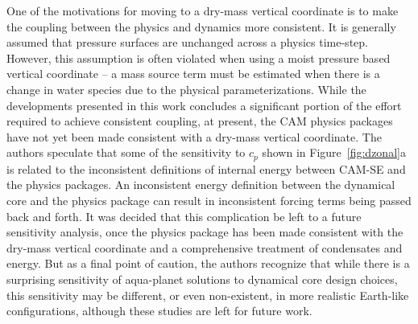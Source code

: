 \documentclass{agujournal}
\begin{document}
One of the motivations for moving to a dry-mass vertical coordinate is to make the coupling between the physics and dynamics more consistent. It is generally assumed that pressure surfaces are unchanged across a physics time-step. However, this assumption is often violated when using a moist pressure based vertical coordinate -- a mass source term must be estimated when there is a change in water species due to the physical parameterizations. While the developments presented in this work concludes a significant portion of the effort required to achieve consistent coupling, at present, the CAM physics packages have not yet been made consistent with a dry-mass vertical coordinate. The authors speculate that some of the sensitivity to $c_p$ shown in Figure~\ref{fig:dzonal}a is related to the inconsistent definitions of internal energy between CAM-SE and the physics packages. An inconsistent energy definition between the dynamical core and the physics package can result in inconsistent forcing terms being passed back and forth. It was decided that this complication be left to a future sensitivity analysis, once the physics package has been made consistent with the dry-mass vertical coordinate and a comprehensive treatment of condensates and energy. But as a final point of caution, the authors recognize that while there is a surprising sensitivity of aqua-planet solutions to dynamical core design choices, this sensitivity may be different, or even non-existent, in more realistic Earth-like configurations, although these studies are left for future work.
\end{document}
